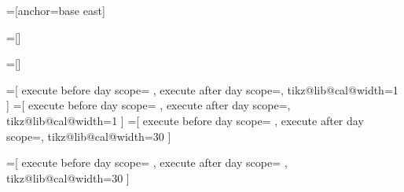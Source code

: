 =[anchor=base east]

=[]

=[]

\def\tikzdaycode{\node[name=\pgfcalendarsuggestedname,every day]{\tikzdaytext};}
\def\tikzmonthcode{\node[every month]{\tikzmonthtext};}
\def\tikzyearcode{\node[every year]{\tikzyeartext};}

\def\tikzdaytext{\%d-}
\def\tikzmonthtext{\%mt}
\def\tikzyeartext{\%y0}




\def\tikz@lib@cal@width{1}

%
%

=[%
  execute before day scope={
  },  
  execute after day scope={\setlength{\pgf@y}{\tikz@lib@cal@yshift}\pgftransformyshift{-\pgf@y}},
  tikz@lib@cal@width=1
]
=[%
  execute before day scope={
  },  
  execute after day scope={\pgftransformyshift\tikz@lib@cal@yshift},
  tikz@lib@cal@width=1
]
=[%
  execute before day scope={
  },  
  execute after day scope={\pgftransformxshift\tikz@lib@cal@xshift},
  tikz@lib@cal@width=30%
]

=[%
  execute before day scope={
  },  
  execute after day scope={
    \setlength{\pgf@x}{\tikz@lib@cal@xshift}
    \pgftransformxshift{-\pgf@x}%
  },
  tikz@lib@cal@width=30%
]



